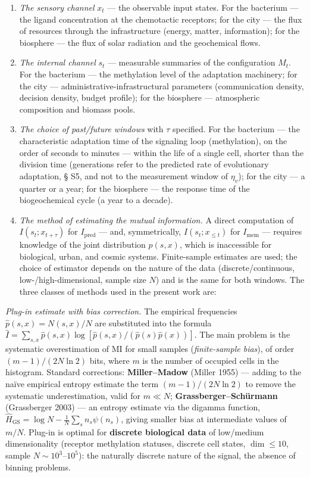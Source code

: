 \documentclass[pdflatex,sn-mathphys-ay]{sn-jnl}
\begin{document}
\begin{enumerate}
\def\labelenumi{(\alph{enumi})}
\item
  \emph{The sensory channel} \(x_t\) --- the observable input states. For the bacterium --- the ligand concentration at the chemotactic receptors; for the city --- the flux of resources through the infrastructure (energy, matter, information); for the biosphere --- the flux of solar radiation and the geochemical flows.
\item
  \emph{The internal channel} \(s_t\) --- measurable summaries of the configuration \(M_t\). For the bacterium --- the methylation level of the adaptation machinery; for the city --- administrative-infrastructural parameters (communication density, decision density, budget profile); for the biosphere --- atmospheric composition and biomass pools.
\item
  \emph{The choice of past/future windows} with \(\tau\) specified. For the bacterium --- the characteristic adaptation time of the signaling loop (methylation), on the order of seconds to minutes --- within the life of a single cell, shorter than the division time (generations refer to the predicted rate of evolutionary adaptation, § S5, and not to the measurement window of \(\eta_v\)); for the city --- a quarter or a year; for the biosphere --- the response time of the biogeochemical cycle (a year to a decade).
\item
  \emph{The method of estimating the mutual information.} A direct computation of \(I(s_t; x_{t+\tau})\) for \(I_{\text{pred}}\) --- and, symmetrically, \(I(s_t; x_{\le t})\) for \(I_{\text{mem}}\) --- requires knowledge of the joint distribution \(p(s, x)\), which is inaccessible for biological, urban, and cosmic systems. Finite-sample estimates are used; the choice of estimator depends on the nature of the data (discrete/continuous, low-/high-dimensional, sample size \(N\)) and is the same for both windows. The three classes of methods used in the present work are:
\end{enumerate}

\emph{Plug-in estimate with bias correction.} The empirical frequencies \(\hat p(s, x) = N(s, x)/N\) are substituted into the formula \(\hat I = \sum_{s, x} \hat p(s, x) \log[\hat p(s, x)/(\hat p(s) \hat p(x))]\). The main problem is the systematic overestimation of MI for small samples (\emph{finite-sample bias}), of order \((m-1)/(2N \ln 2)\) bits, where \(m\) is the number of occupied cells in the histogram. Standard corrections: \textbf{Miller--Madow} (Miller 1955) --- adding to the naïve empirical entropy estimate the term \((m-1)/(2N \ln 2)\) to remove the systematic underestimation, valid for \(m \ll N\); \textbf{Grassberger--Schürmann} (Grassberger 2003) --- an entropy estimate via the digamma function, \(\hat H_{\text{GS}} = \log N - \frac{1}{N} \sum_s n_s \psi(n_s)\), giving smaller bias at intermediate values of \(m/N\). Plug-in is optimal for \textbf{discrete biological data} of low/medium dimensionality (receptor methylation statuses, discrete cell states, \(\dim \le 10\), sample \(N \sim 10^3\)--\(10^5\)): the naturally discrete nature of the signal, the absence of binning problems.
\end{document}
